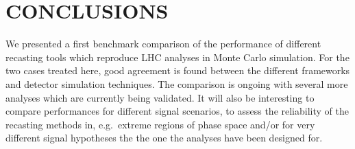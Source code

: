 \documentclass[11pt]{cernrep}
\begin{document}

\section*{CONCLUSIONS}
We presented a first benchmark comparison of the performance of different recasting tools 
which reproduce LHC analyses in Monte Carlo simulation.
For the two cases treated here, good agreement is found between the different frameworks and detector simulation techniques. 
The comparison is ongoing with several more analyses which are currently being validated. 
It will also be interesting to compare performances for different signal scenarios, to assess the reliability of the 
recasting methods in, e.g.\  extreme regions of phase space and/or for very different signal hypotheses the the 
one the analyses have been designed for.



\end{document}
